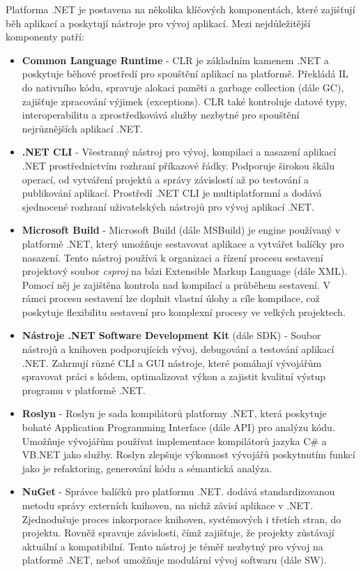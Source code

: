 

Platforma .NET je postavena na několika klíčových komponentách, které zajišťují běh aplikací a poskytují nástroje pro vývoj aplikací. Mezi nejdůležitější komponenty patří:

\begin{itemize}
    \item \textbf{Common Language Runtime} - CLR je základním kamenem .NET a poskytuje běhové prostředí pro spouštění aplikací na platformě. Překládá IL do nativního kódu, spravuje alokaci paměti a garbage collection (dále GC), zajišťuje zpracování výjimek (exceptions). CLR také kontroluje datové typy, interoperabilitu a zprostředkovává služby nezbytné pro spouštění nejrůznějších aplikací .NET. \cite{Richter2012}
    \item \textbf{.NET CLI} - Všestranný nástroj pro vývoj, kompilaci a nasazení aplikací .NET prostřednictvím rozhraní příkazové řádky. Podporuje širokou škálu operací, od vytváření projektů a správy závislostí až po testování a publikování aplikací. \cite{netdocscli} Prostředí .NET CLI je multiplatformní a dodává sjednocené rozhraní uživatelských nástrojů pro vývoj aplikací .NET. 
    \item \textbf{Microsoft Build} - Microsoft Build (dále MSBuild) je engine používaný v platformě .NET, který umožňuje sestavovat aplikace a vytvářet balíčky pro nasazení. \cite{netdocsmsbuild} Tento nástroj používá k organizaci a řízení procesu sestavení projektový soubor \emph{csproj} na bázi Extensible Markup Language (dále XML). Pomocí něj je zajištěna kontrola nad kompilací a průběhem sestavení. V rámci procesu sestavení lze doplnit vlastní úlohy a cíle kompilace, což poskytuje flexibilitu sestavení pro komplexní procesy ve velkých projektech.
    \item \textbf{Nástroje .NET Software Development Kit} (dále SDK) - Soubor nástrojů a knihoven podporujících vývoj, debugování a testování aplikací .NET. Zahrnují různé CLI a GUI nástroje, které pomáhají vývojářům spravovat práci s kódem, optimalizovat výkon a zajistit kvalitní výstup programu v platformě .NET. \cite{Price2023c8}
    \item \textbf{Roslyn} - Roslyn je sada kompilátorů platformy .NET, která poskytuje bohaté Application Programming Interface (dále API) pro analýzu kódu. \cite{Harrison2017} Umožňuje vývojářům používat implementace kompilátorů jazyka C\# a VB.NET jako služby. Roslyn zlepšuje výkonnost vývojářů poskytnutím funkcí jako je refaktoring, generování kódu a sémantická analýza.
    \item \textbf{NuGet} - Správce balíčků pro platformu .NET. dodává standardizovanou metodu správy externích knihoven, na nichž závisí aplikace v .NET. \cite{Williams2023} Zjednodušuje proces inkorporace knihoven, systémových i třetích stran, do projektu. Rovněž spravuje závislosti, čímž zajišťuje, že projekty zůstávají aktuální a kompatibilní. Tento nástroj je téměř nezbytný pro vývoj na platformě .NET, neboť umožňuje modulární vývoj softwaru (dále SW). 
\end{itemize}

